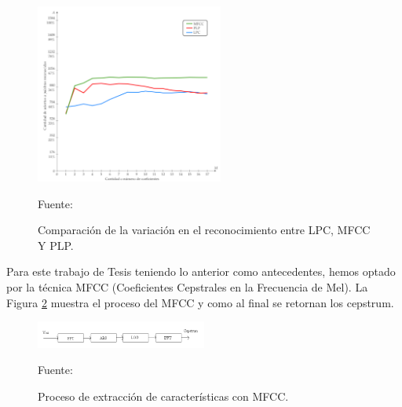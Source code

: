 \begin{enumerate}
\newpage
\begin{figure}[ht]
\begin{center}
\includegraphics[width=0.55\textwidth]{Imagenes/Cap2/image037}
\end{center}
\begin{center}
\vskip -0.5cm
\caption{\small{Comparación de la variación en el reconocimiento entre LPC, MFCC Y PLP.}}
\label{fig:figura2.36}
{\small{Fuente: \cite{unam}}}
\end{center}
\end{figure}

Para este trabajo de Tesis teniendo lo anterior como antecedentes, hemos optado por la técnica MFCC (Coeficientes Cepstrales en la Frecuencia de Mel). La Figura \ref{fig:figura2.37} muestra el proceso del MFCC y como al final se retornan los cepstrum.

\begin{figure}[ht]
\begin{center}
\includegraphics[width=0.5\textwidth]{Imagenes/Cap2/image038}
\end{center}
\begin{center}
\vskip -0.5cm
\caption{\small{Proceso de extracción de características con MFCC.}}
\label{fig:figura2.37}
{\small{Fuente: \cite{rabiner}}}
\end{center}
\end{figure}


\end{enumerate}
